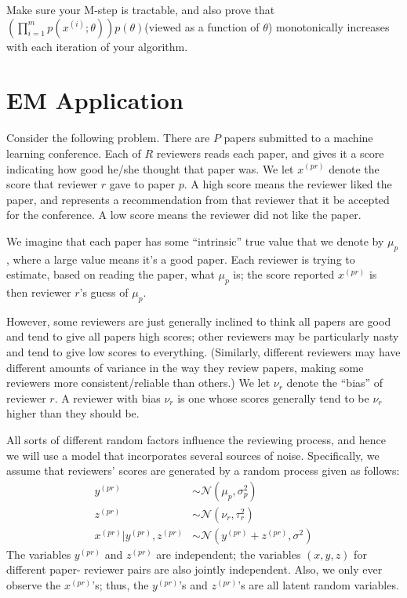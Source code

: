 \documentclass{article}
\theoremstyle{definition}
\theoremstyle{definition}
\theoremstyle{remark}
\begin{document}
Make sure your M-step is tractable, and also prove that $(\prod_{i = 1}^mp(x^{(i)};\theta))p(\theta)$(viewed as a
function of $\theta$) monotonically increases with each iteration of your algorithm.

\section*{EM Application}
Consider the following problem. There are $P$ papers submitted to a machine learning
conference. Each of $R$ reviewers reads each paper, and gives it a score indicating how good
he/she thought that paper was. We let $x^{(pr)}$ denote the score that reviewer $r$ gave to paper
$p$. A high score means the reviewer liked the paper, and represents a recommendation from
that reviewer that it be accepted for the conference. A low score means the reviewer did
not like the paper.

We imagine that each paper has some ``intrinsic'' true value that we denote by $\mu_p$, where a
large value means it's a good paper. Each reviewer is trying to estimate, based on reading
the paper, what $\mu_p$ is; the score reported $x^{(pr)}$ is then reviewer $r$'s guess of $\mu_p$.

However, some reviewers are just generally inclined to think all papers are good and tend
to give all papers high scores; other reviewers may be particularly nasty and tend to give
low scores to everything. (Similarly, different reviewers may have different amounts of
variance in the way they review papers, making some reviewers more consistent/reliable
than others.) We let $\nu_r$ denote the ``bias'' of reviewer $r$. A reviewer with bias $\nu_r$ is one
whose scores generally tend to be $\nu_r$ higher than they should be.

All sorts of different random factors influence the reviewing process, and hence we will use
a model that incorporates several sources of noise. Specifically, we assume that reviewers'
scores are generated by a random process given as follows:
\begin{equation}
  \begin{aligned}
  y^{(pr)} &\sim \mathcal{N}(\mu_p, \sigma_p^2) \\
  z^{(pr)} &\sim \mathcal{N}(\nu_r, \tau_r^2) \\
  x^{(pr)} |y^{(pr)}, z^{(pr)} &\sim \mathcal{N}(y^{(pr)} + z^{(pr)}, \sigma^2)
  \end{aligned}
\end{equation}
The variables $y^{(pr)}$ and $z^{(pr)}$ are independent; the variables $(x, y, z)$ for different paper-
reviewer pairs are also jointly independent. Also, we only ever observe the $x^{(pr)}$'s; thus,
the $y^{(pr)}$'s and $z^{(pr)}$'s are all latent random variables.
\end{document}
